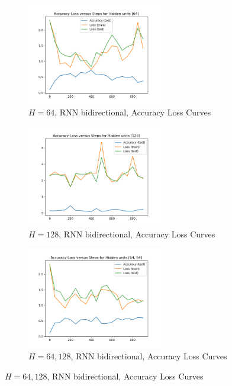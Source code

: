 \begin{figure}[!htbp]
\begin{subfigure}
\centering
\includegraphics[angle=0,width=0.65\textwidth]{assign-3/logs/Q1-MNIST-RNN-[64].png}
\caption{$H=64$, RNN bidirectional, Accuracy Loss Curves}
\end{subfigure}
\begin{subfigure}
\centering
\includegraphics[angle=0,width=0.65\textwidth]{assign-3/logs/Q1-MNIST-RNN-[128].png}
\caption{$H=128$, RNN bidirectional, Accuracy Loss Curves}
\end{subfigure}
\begin{subfigure}
\centering
\includegraphics[angle=0,width=0.65\textwidth]{assign-3/logs/Q1-MNIST-RNN-[64, 64].png}
\caption{$H=64, 128$, RNN bidirectional, Accuracy Loss Curves}
\end{subfigure}
\end{figure}

